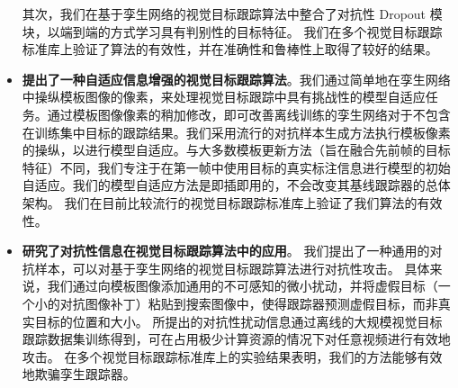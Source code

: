 \begin{itemize}
其次，我们在基于孪生网络的视觉目标跟踪算法中整合了对抗性 Dropout 模块，以端到端的方式学习具有判别性的目标特征。
我们在多个视觉目标跟踪标准库上验证了算法的有效性，并在准确性和鲁棒性上取得了较好的结果。
\item \textbf{提出了一种自适应信息增强的视觉目标跟踪算法}。我们通过简单地在孪生网络中操纵模板图像的像素，来处理视觉目标跟踪中具有挑战性的模型自适应任务。通过模板图像像素的稍加修改，即可改善离线训练的孪生网络对于不包含在训练集中目标的跟踪结果。我们采用流行的对抗样本生成方法执行模板像素的操纵，以进行模型自适应。与大多数模板更新方法（旨在融合先前帧的目标特征）不同，我们专注于在第一帧中使用目标的真实标注信息进行模型的初始自适应。我们的模型自适应方法是即插即用的，不会改变其基线跟踪器的总体架构。
我们在目前比较流行的视觉目标跟踪标准库上验证了我们算法的有效性。
\item \textbf{研究了对抗性信息在视觉目标跟踪算法中的应用}。
我们提出了一种通用的对抗样本，可以对基于孪生网络的视觉目标跟踪算法进行对抗性攻击。
具体来说，我们通过向模板图像添加通用的不可感知的微小扰动，并将虚假目标（一个小的对抗图像补丁）粘贴到搜索图像中，使得跟踪器预测虚假目标，而非真实目标的位置和大小。
所提出的对抗性扰动信息通过离线的大规模视觉目标跟踪数据集训练得到，可在占用极少计算资源的情况下对任意视频进行有效地攻击。
在多个视觉目标跟踪标准库上的实验结果表明，我们的方法能够有效地欺骗孪生跟踪器。
\end{itemize}


